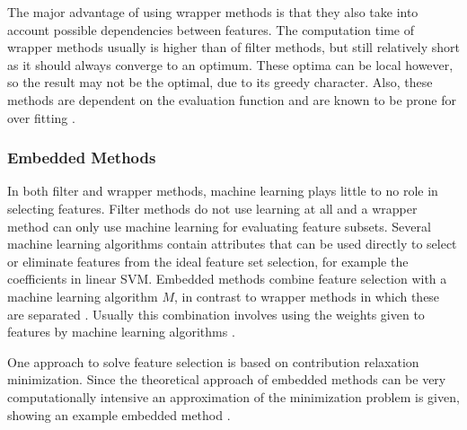\documentclass[10pt,a4paper]{report}
\begin{document}
	The major advantage of using wrapper methods is that they also take into account possible dependencies between features. The computation time of wrapper methods usually is higher than of filter methods, but still relatively short as it should always converge to an optimum. These optima can be local however, so the result may not be the optimal, due to its greedy character. Also, these methods are dependent on the evaluation function and are known to be prone for over fitting \cite{Reunanen2006, saeys2007review}.
	
	\subsubsection{Embedded Methods}
	\label{FSsubsec:EmbeddedMethods}
	
	In both filter and wrapper methods, machine learning plays little to no role in selecting features. Filter methods do not use learning at all and a wrapper method can only use machine learning for evaluating feature subsets. Several machine learning algorithms contain attributes that can be used directly to select or eliminate features from the ideal feature set selection, for example the coefficients in linear SVM. Embedded methods combine feature selection with a machine learning algorithm $M$, in contrast to wrapper methods in which these are separated \cite{Lal2006}. Usually this combination involves using the weights given to features by machine learning algorithms \cite{blum1997selection}.
	
	One approach to solve feature selection is based on contribution relaxation minimization. Since the theoretical approach of embedded methods can be very computationally intensive an approximation of the minimization problem is given, showing an example embedded method \cite{Lal2006}.
	
\end{document}
